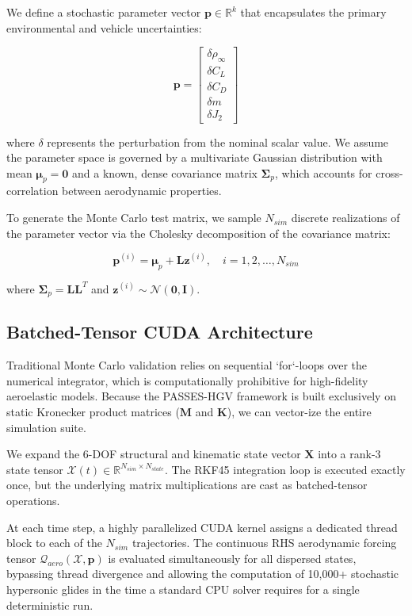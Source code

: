 \documentclass[11pt,a4paper]{article}
\theoremstyle{definition}
\numberwithin{equation}{section}
\newcommand{\R}{\mathbb{R}}
\begin{document}
We define a stochastic parameter vector $\mathbf{p} \in \R^k$ that encapsulates the primary environmental and vehicle uncertainties:

$$\mathbf{p} = \begin{bmatrix} \delta \rho_\infty \\ \delta C_L \\ \delta C_D \\ \delta m \\ \delta J_2 \end{bmatrix}$$

where $\delta$ represents the perturbation from the nominal scalar value. We assume the parameter space is governed by a multivariate Gaussian distribution with mean $\boldsymbol{\mu}_p = \mathbf{0}$ and a known, dense covariance matrix $\boldsymbol{\Sigma}_p$, which accounts for cross-correlation between aerodynamic properties.

To generate the Monte Carlo test matrix, we sample $N_{sim}$ discrete realizations of the parameter vector via the Cholesky decomposition of the covariance matrix:

$$\mathbf{p}^{(i)} = \boldsymbol{\mu}_p + \mathbf{L} \mathbf{z}^{(i)}, \quad i = 1, 2, \dots, N_{sim}$$

where $\boldsymbol{\Sigma}_p = \mathbf{L} \mathbf{L}^T$ and $\mathbf{z}^{(i)} \sim \mathcal{N}(\mathbf{0}, \mathbf{I})$.

\subsection{Batched-Tensor CUDA Architecture}

Traditional Monte Carlo validation relies on sequential `for`-loops over the numerical integrator, which is computationally prohibitive for high-fidelity aeroelastic models. Because the PASSES-HGV framework is built exclusively on static Kronecker product matrices ($\mathbf{M}$ and $\mathbf{K}$), we can vector-ize the entire simulation suite.

We expand the 6-DOF structural and kinematic state vector $\mathbf{X}$ into a rank-3 state tensor $\boldsymbol{\mathcal{X}}(t) \in \R^{N_{sim} \times N_{state}}$. The RKF45 integration loop is executed exactly once, but the underlying matrix multiplications are cast as batched-tensor operations.

At each time step, a highly parallelized CUDA kernel assigns a dedicated thread block to each of the $N_{sim}$ trajectories. The continuous RHS aerodynamic forcing tensor $\boldsymbol{\mathcal{Q}}_{aero}(\boldsymbol{\mathcal{X}}, \mathbf{p})$ is evaluated simultaneously for all dispersed states, bypassing thread divergence and allowing the computation of 10,000+ stochastic hypersonic glides in the time a standard CPU solver requires for a single deterministic run.
\end{document}
